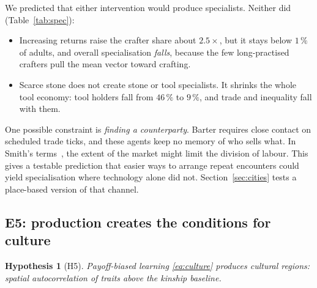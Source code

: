 \documentclass[11pt]{article}
\newtheorem{hypothesis}{Hypothesis}
\theoremstyle{definition}
\newcommand{\1}{\mathbf{1}}
\begin{document}
We predicted that either intervention would produce specialists. Neither did (Table~\ref{tab:spec}):
\begin{itemize}
\item Increasing returns raise the crafter share about $2.5\times$, but it stays below $1\,\%$ of adults, and overall specialisation \emph{falls}, because the few long-practised crafters pull the mean vector toward crafting.
\item Scarce stone does not create stone or tool specialists. It shrinks the whole tool economy: tool holders fall from $46\,\%$ to $9\,\%$, and trade and inequality fall with them.
\end{itemize}
One possible constraint is \emph{finding a counterparty}. Barter requires close contact on scheduled trade ticks, and these agents keep no memory of who sells what. In Smith's terms~\cite{smith1776}, the extent of the market might limit the division of labour. This gives a testable prediction that easier ways to arrange repeat encounters could yield specialisation where technology alone did not. Section~\ref{sec:cities} tests a place-based version of that channel.

\subsection{E5: production creates the conditions for culture}

\begin{hypothesis}[H5]
Payoff-biased learning \eqref{eq:culture} produces cultural regions: spatial autocorrelation of traits above the kinship baseline.
\end{hypothesis}
\end{document}
